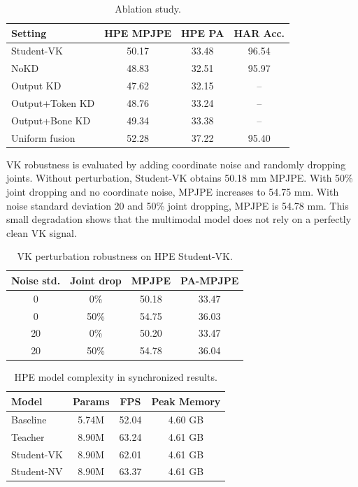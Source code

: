 \documentclass[journal, twocolumn, transmag]{IEEEtran}
\newcommand{\smalltab}{\scriptsize}
\begin{document}
\begin{table}[t]
	\caption{Ablation study.}
	\label{tab:ablation}
	\centering
	\smalltab
	\begin{tabular}{lccc}
		\toprule
		Setting & HPE MPJPE & HPE PA & HAR Acc.\\
		\midrule
		Student-VK & 50.17 & 33.48 & 96.54\\
		NoKD & 48.83 & 32.51 & 95.97\\
		Output KD & 47.62 & 32.15 & --\\
		Output+Token KD & 48.76 & 33.24 & --\\
		Output+Bone KD & 49.34 & 33.38 & --\\
		Uniform fusion & 52.28 & 37.22 & 95.40\\
		\bottomrule
	\end{tabular}
\end{table}

VK robustness is evaluated by adding coordinate noise and randomly dropping joints. Without perturbation, Student-VK obtains 50.18 mm MPJPE. With 50\% joint dropping and no coordinate noise, MPJPE increases to 54.75 mm. With noise standard deviation 20 and 50\% joint dropping, MPJPE is 54.78 mm. This small degradation shows that the multimodal model does not rely on a perfectly clean VK signal.

\begin{table}[t]
	\caption{VK perturbation robustness on HPE Student-VK.}
	\label{tab:vk-robust}
	\centering
	\smalltab
	\begin{tabular}{cccc}
		\toprule
		Noise std. & Joint drop & MPJPE & PA-MPJPE\\
		\midrule
		0 & 0\% & 50.18 & 33.47\\
		0 & 50\% & 54.75 & 36.03\\
		20 & 0\% & 50.20 & 33.47\\
		20 & 50\% & 54.78 & 36.04\\
		\bottomrule
	\end{tabular}
\end{table}

\begin{table}[t]
	\caption{HPE model complexity in synchronized results.}
	\label{tab:complexity}
	\centering
	\smalltab
	\begin{tabular}{lccc}
		\toprule
		Model & Params & FPS & Peak Memory\\
		\midrule
		Baseline & 5.74M & 52.04 & 4.60 GB\\
		Teacher & 8.90M & 63.24 & 4.61 GB\\
		Student-VK & 8.90M & 62.01 & 4.61 GB\\
		Student-NV & 8.90M & 63.37 & 4.61 GB\\
		\bottomrule
	\end{tabular}
\end{table}
\end{document}
